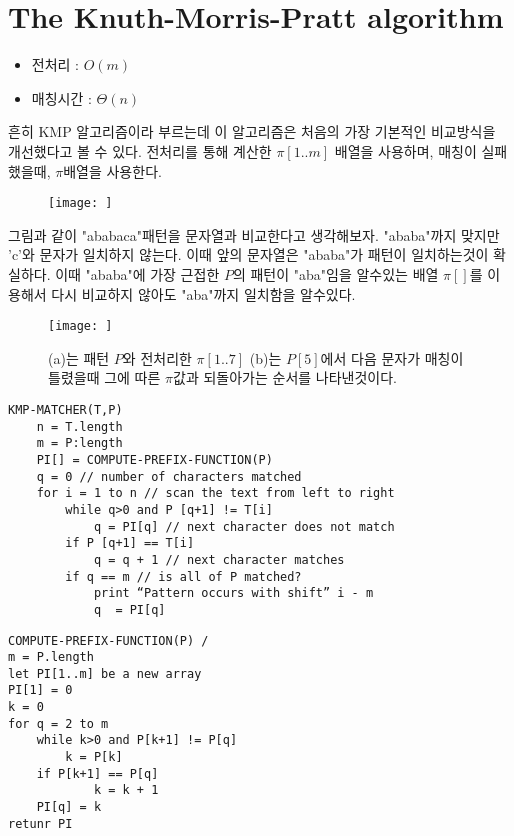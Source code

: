\section{The Knuth-Morris-Pratt algorithm}

\begin{itemize}
    \item 전처리 : $O(m)$
    \item 매칭시간 : $\Theta(n)$
\end{itemize}


흔히 KMP 알고리즘이라 부르는데 이 알고리즘은 처음의 가장 기본적인 비교방식을 개선했다고 볼 수 있다. 전처리를 통해 계산한 $\pi[1..m]$ 배열을 사용하며, 매칭이 실패했을때, $\pi$배열을 사용한다.

\begin{figure}[h!]
    \centering
    \texttt{[image: ]}
    \caption{}
\end{figure}

그림과 같이 "ababaca"패턴을 문자열과 비교한다고 생각해보자.
"ababa"까지 맞지만 'c'와 문자가 일치하지 않는다. 이때 앞의 문자열은 "ababa"가 패턴이 일치하는것이 확실하다. 이때 "ababa"에 가장 근접한 $P$의 패턴이 "aba"임을 알수있는 배열 $\pi[]$를 이용해서 다시 비교하지 않아도 "aba"까지 일치함을 알수있다. 


\begin{figure}[h!]
    \centering
    \texttt{[image: ]}
    \caption{(a)는 패턴 $P$와 전처리한 $\pi[1..7]$ (b)는 $P[5]$에서 다음 문자가 매칭이 틀렸을때 그에 따른 $\pi$값과 되돌아가는 순서를 나타낸것이다.}
\end{figure}


\begin{lstlisting}[syle = CStyle]
KMP-MATCHER(T,P)
    n = T.length
    m = P:length
    PI[] = COMPUTE-PREFIX-FUNCTION(P)
    q = 0 // number of characters matched
    for i = 1 to n // scan the text from left to right
        while q>0 and P [q+1] != T[i]
            q = PI[q] // next character does not match  
        if P [q+1] == T[i]
            q = q + 1 // next character matches
        if q == m // is all of P matched?
            print “Pattern occurs with shift” i - m
            q  = PI[q]
\end{lstlisting}



\begin{lstlisting}[syle = CStyle]
COMPUTE-PREFIX-FUNCTION(P) /
m = P.length
let PI[1..m] be a new array
PI[1] = 0
k = 0
for q = 2 to m
    while k>0 and P[k+1] != P[q]
        k = P[k]
    if P[k+1] == P[q]
            k = k + 1
    PI[q] = k 
retunr PI
\end{lstlisting}
